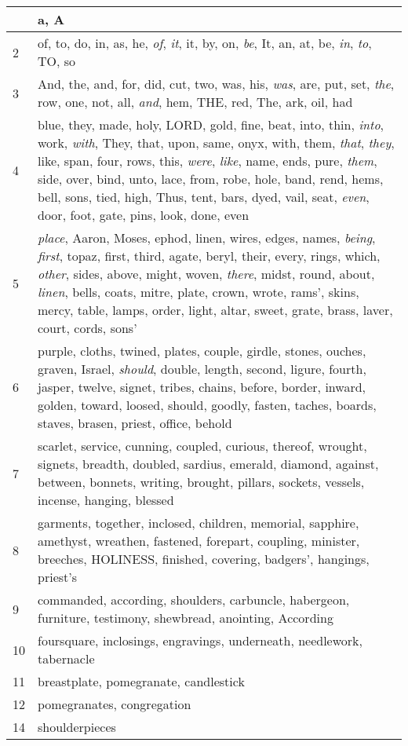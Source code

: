 \begin{longtable}{l|p{3.75in}}
\hline \hline
\endlastfoot
1 & a, A \\ \hline
2 & of, to, do, in, as, he, \emph{of}, \emph{it}, it, by, on, \emph{be}, It, an, at, be, \emph{in}, \emph{to}, TO, so \\ \hline
3 & And, the, and, for, did, cut, two, was, his, \emph{was}, are, put, set, \emph{the}, row, one, not, all, \emph{and}, hem, THE, red, The, ark, oil, had \\ \hline
4 & blue, they, made, holy, LORD, gold, fine, beat, into, thin, \emph{into}, work, \emph{with}, They, that, upon, same, onyx, with, them, \emph{that}, \emph{they}, like, span, four, rows, this, \emph{were}, \emph{like}, name, ends, pure, \emph{them}, side, over, bind, unto, lace, from, robe, hole, band, rend, hems, bell, sons, tied, high, Thus, tent, bars, dyed, vail, seat, \emph{even}, door, foot, gate, pins, look, done, even \\ \hline
5 & \emph{place}, Aaron, Moses, ephod, linen, wires, edges, names, \emph{being}, \emph{first}, topaz, first, third, agate, beryl, their, every, rings, which, \emph{other}, sides, above, might, woven, \emph{there}, midst, round, about, \emph{linen}, bells, coats, mitre, plate, crown, wrote, rams', skins, mercy, table, lamps, order, light, altar, sweet, grate, brass, laver, court, cords, sons' \\ \hline
6 & purple, cloths, twined, plates, couple, girdle, stones, ouches, graven, Israel, \emph{should}, double, length, second, ligure, fourth, jasper, twelve, signet, tribes, chains, before, border, inward, golden, toward, loosed, should, goodly, fasten, taches, boards, staves, brasen, priest, office, behold \\ \hline
7 & scarlet, service, cunning, coupled, curious, thereof, wrought, signets, breadth, doubled, sardius, emerald, diamond, against, between, bonnets, writing, brought, pillars, sockets, vessels, incense, hanging, blessed \\ \hline
8 & garments, together, inclosed, children, memorial, sapphire, amethyst, wreathen, fastened, forepart, coupling, minister, breeches, HOLINESS, finished, covering, badgers', hangings, priest's \\ \hline
9 & commanded, according, shoulders, carbuncle, habergeon, furniture, testimony, shewbread, anointing, According \\ \hline
10 & foursquare, inclosings, engravings, underneath, needlework, tabernacle \\ \hline
11 & breastplate, pomegranate, candlestick \\ \hline
12 & pomegranates, congregation \\ \hline
14 & shoulderpieces \\ \hline
\end{longtable}






